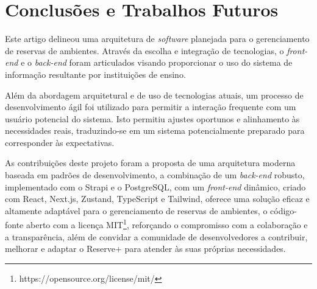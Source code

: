 \documentclass[12pt]{article}
\begin{document}
\section{Conclusões e Trabalhos Futuros}

Este artigo delineou uma arquitetura de \textit{software} planejada para o gerenciamento de reservas de ambientes. Através da escolha e integração de tecnologias, o \textit{front-end} e o \textit{back-end} foram articulados visando proporcionar  o uso do sistema de informação resultante por instituições de ensino.

Além da abordagem arquitetural e de uso de tecnologias atuais, um processo de desenvolvimento ágil foi utilizado para permitir a interação frequente com um usuário potencial do sistema. Isto permitiu ajustes oportunos e alinhamento às necessidades reais, traduzindo-se em um sistema potencialmente preparado para corresponder às expectativas.

As contribuições deste projeto foram a proposta de uma arquitetura moderna baseada em padrões de desenvolvimento, a combinação de um \textit{back-end} robusto, implementado com o Strapi e o PostgreSQL, com um \textit{front-end} dinâmico, criado com React, Next.js, Zustand, TypeScript e Tailwind, oferece uma solução eficaz e altamente adaptável para o gerenciamento de reservas de ambientes, o código-fonte aberto com a licença MIT\footnote{https://opensource.org/license/mit/}, reforçando o compromisso com a colaboração e a transparência, além de convidar a comunidade de desenvolvedores a contribuir, melhorar e adaptar o Reserve+ para atender às suas próprias necessidades.
\end{document}
